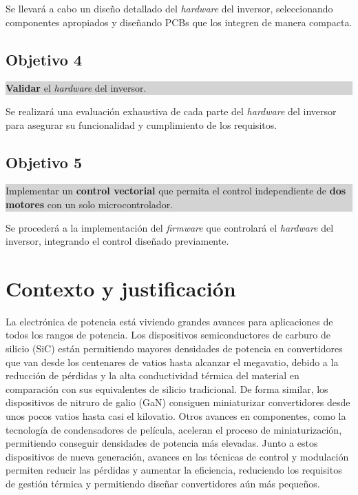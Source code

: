 Se llevará a cabo un diseño detallado del \textit{hardware} del inversor, seleccionando componentes apropiados y diseñando PCBs que los integren de manera compacta.

\subsection*{Objetivo 4}
\colorbox{lightgray}{%
	\parbox{\dimexpr\linewidth-2\fboxsep-2\fboxrule}{%
		\textbf{Validar} el \textit{hardware} del inversor.%
	}%
}

Se realizará una evaluación exhaustiva de cada parte del \textit{hardware} del inversor para asegurar su funcionalidad y cumplimiento de los requisitos.

\subsection*{Objetivo 5}
\colorbox{lightgray}{%
	\parbox{\dimexpr\linewidth-2\fboxsep-2\fboxrule}{%
		Implementar un \textbf{control vectorial} que permita el control independiente de \textbf{dos motores} con un solo microcontrolador.%
	}%
}

Se procederá a la implementación del \textit{firmware} que controlará el \textit{hardware} del inversor, integrando el control diseñado previamente.

\section{Contexto y justificación}

La electrónica de potencia está viviendo grandes avances para aplicaciones de todos los rangos de potencia. Los dispositivos semiconductores de carburo de silicio (SiC) están permitiendo mayores densidades de potencia en convertidores que van desde los centenares de vatios hasta alcanzar el megavatio, debido a la reducción de pérdidas y la alta conductividad térmica del material en comparación con sus equivalentes de silicio tradicional. De forma similar, los dispositivos de nitruro de galio (GaN) consiguen miniaturizar convertidores desde unos pocos vatios hasta casi el kilovatio. Otros avances en componentes, como la tecnología de condensadores de película, aceleran el proceso de miniaturización, permitiendo conseguir densidades de potencia más elevadas. Junto a estos dispositivos de nueva generación, avances en las técnicas de control y modulación permiten reducir las pérdidas y aumentar la eficiencia, reduciendo los requisitos de gestión térmica y permitiendo diseñar convertidores aún más pequeños.

